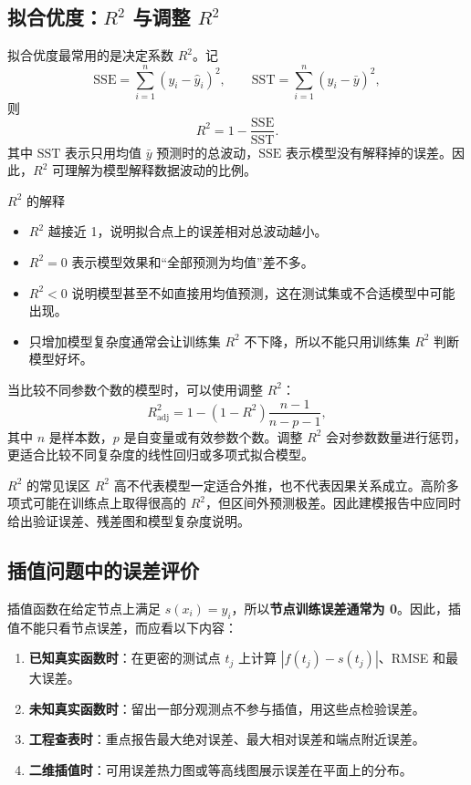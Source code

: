 \documentclass[11pt,a4paper]{ctexart}
\begin{document}
\subsection{拟合优度：$R^2$ 与调整 $R^2$}

拟合优度最常用的是决定系数 $R^2$。记
\[
 \mathrm{SSE}=\sum_{i=1}^n(y_i-\hat y_i)^2,\qquad
 \mathrm{SST}=\sum_{i=1}^n(y_i-\bar y)^2,
\]
则
\[
 R^2=1-\frac{\mathrm{SSE}}{\mathrm{SST}}.
\]
其中 $\mathrm{SST}$ 表示只用均值 $\bar y$ 预测时的总波动，$\mathrm{SSE}$ 表示模型没有解释掉的误差。因此，$R^2$ 可理解为模型解释数据波动的比例。

\begin{keybox}{$R^2$ 的解释}
\begin{itemize}
  \item $R^2$ 越接近 1，说明拟合点上的误差相对总波动越小。
  \item $R^2=0$ 表示模型效果和“全部预测为均值”差不多。
  \item $R^2<0$ 说明模型甚至不如直接用均值预测，这在测试集或不合适模型中可能出现。
  \item 只增加模型复杂度通常会让训练集 $R^2$ 不下降，所以不能只用训练集 $R^2$ 判断模型好坏。
\end{itemize}
\end{keybox}

当比较不同参数个数的模型时，可以使用调整 $R^2$：
\[
 R^2_{\mathrm{adj}}=1-(1-R^2)\frac{n-1}{n-p-1},
\]
其中 $n$ 是样本数，$p$ 是自变量或有效参数个数。调整 $R^2$ 会对参数数量进行惩罚，更适合比较不同复杂度的线性回归或多项式拟合模型。

\begin{warnbox}{$R^2$ 的常见误区}
$R^2$ 高不代表模型一定适合外推，也不代表因果关系成立。高阶多项式可能在训练点上取得很高的 $R^2$，但区间外预测极差。因此建模报告中应同时给出验证误差、残差图和模型复杂度说明。
\end{warnbox}

\subsection{插值问题中的误差评价}

插值函数在给定节点上满足 $s(x_i)=y_i$，所以\textbf{节点训练误差通常为 0}。因此，插值不能只看节点误差，而应看以下内容：

\begin{enumerate}[label=\arabic*)]
  \item \textbf{已知真实函数时}：在更密的测试点 $t_j$ 上计算 $|f(t_j)-s(t_j)|$、RMSE 和最大误差。
  \item \textbf{未知真实函数时}：留出一部分观测点不参与插值，用这些点检验误差。
  \item \textbf{工程查表时}：重点报告最大绝对误差、最大相对误差和端点附近误差。
  \item \textbf{二维插值时}：可用误差热力图或等高线图展示误差在平面上的分布。
\end{enumerate}
\end{document}
